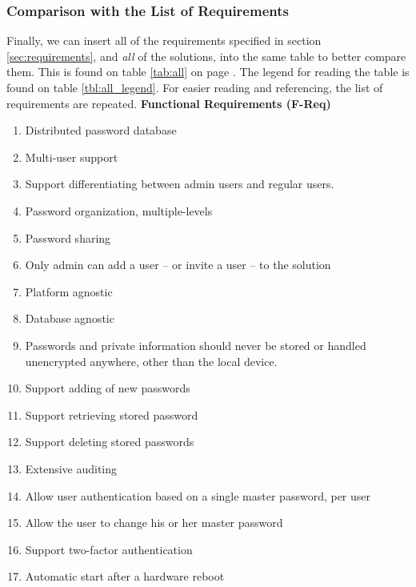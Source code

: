 			\subsubsection*{Comparison with the List of Requirements}
				Finally, we can insert all of the requirements specified in section \ref{sec:requirements}, and \emph{all} of the solutions, into the same table to better compare them. This is found on table \ref{tab:all} on page \pageref{tab:all}. The legend for reading the table is found on table \ref{tbl:all_legend}. For easier reading and referencing, the list of requirements are repeated. 
				\textbf{Functional Requirements (F-Req)}
					\vspace{-3ex}\begin{enumerate}
						 \setlength\itemsep{0.1em}
						\item Distributed password database \label{item:distrib_password}
						\item Multi-user support \label{item:multi_user}
						\item Support differentiating between admin users and regular users. \label{item:admin_user}
						\item Password organization, multiple-levels \label{item:organization}
						\item Password sharing \label{item:sharing}
						\item Only admin can add a user -- or invite a user -- to the solution \label{item:add}
						\item Platform agnostic \label{item:platform}
						\item Database agnostic \label{item:database}
						\item Passwords and private information should never be stored or handled unencrypted anywhere, other than the local device. \label{item:passwords_local}
						\item Support adding of new passwords \label{item:new}
						\item Support retrieving stored password \label{item:retrieve}
						\item Support deleting stored passwords \label{item:delete}
						\item Extensive auditing \label{item:audit}
						\item Allow user authentication based on a single master password, per user \label{item:auth}
						\item Allow the user to change his or her master password \label{item:change}
						\item Support two-factor authentication \label{item:two-factor}
						\item Automatic start after a hardware reboot \label{item:restart}
					\end{enumerate}
